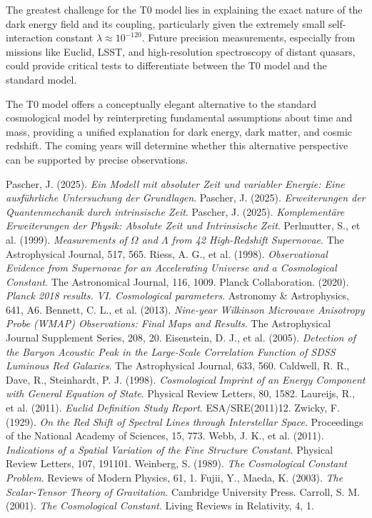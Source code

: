 \documentclass[a4paper,12pt]{article}
\theoremstyle{definition}
\theoremstyle{remark}
\begin{document}
	The greatest challenge for the T0 model lies in explaining the exact nature of the dark energy field and its coupling, particularly given the extremely small self-interaction constant $\lambda \approx 10^{-120}$. Future precision measurements, especially from missions like Euclid, LSST, and high-resolution spectroscopy of distant quasars, could provide critical tests to differentiate between the T0 model and the standard model.
	
	The T0 model offers a conceptually elegant alternative to the standard cosmological model by reinterpreting fundamental assumptions about time and mass, providing a unified explanation for dark energy, dark matter, and cosmic redshift. The coming years will determine whether this alternative perspective can be supported by precise observations.

				
			\begin{thebibliography}{99}
				 Pascher, J. (2025). \textit{Ein Modell mit absoluter Zeit und variabler Energie: Eine ausführliche Untersuchung der Grundlagen}.
				 Pascher, J. (2025). \textit{Erweiterungen der Quantenmechanik durch intrinsische Zeit}.
				 Pascher, J. (2025). \textit{Komplementäre Erweiterungen der Physik: Absolute Zeit und Intrinsische Zeit}.
				 Perlmutter, S., et al. (1999). \textit{Measurements of $\Omega$ and $\Lambda$ from 42 High-Redshift Supernovae}. The Astrophysical Journal, 517, 565.
				 Riess, A. G., et al. (1998). \textit{Observational Evidence from Supernovae for an Accelerating Universe and a Cosmological Constant}. The Astronomical Journal, 116, 1009.
				 Planck Collaboration. (2020). \textit{Planck 2018 results. VI. Cosmological parameters}. Astronomy \& Astrophysics, 641, A6.
				 Bennett, C. L., et al. (2013). \textit{Nine-year Wilkinson Microwave Anisotropy Probe (WMAP) Observations: Final Maps and Results}. The Astrophysical Journal Supplement Series, 208, 20.
				 Eisenstein, D. J., et al. (2005). \textit{Detection of the Baryon Acoustic Peak in the Large-Scale Correlation Function of SDSS Luminous Red Galaxies}. The Astrophysical Journal, 633, 560.
				 Caldwell, R. R., Dave, R., Steinhardt, P. J. (1998). \textit{Cosmological Imprint of an Energy Component with General Equation of State}. Physical Review Letters, 80, 1582.
				 Laureijs, R., et al. (2011). \textit{Euclid Definition Study Report}. ESA/SRE(2011)12.
				 Zwicky, F. (1929). \textit{On the Red Shift of Spectral Lines through Interstellar Space}. Proceedings of the National Academy of Sciences, 15, 773.
				 Webb, J. K., et al. (2011). \textit{Indications of a Spatial Variation of the Fine Structure Constant}. Physical Review Letters, 107, 191101.
				 Weinberg, S. (1989). \textit{The Cosmological Constant Problem}. Reviews of Modern Physics, 61, 1.
				 Fujii, Y., Maeda, K. (2003). \textit{The Scalar-Tensor Theory of Gravitation}. Cambridge University Press.
				 Carroll, S. M. (2001). \textit{The Cosmological Constant}. Living Reviews in Relativity, 4, 1.
			\end{thebibliography}
\end{document}
